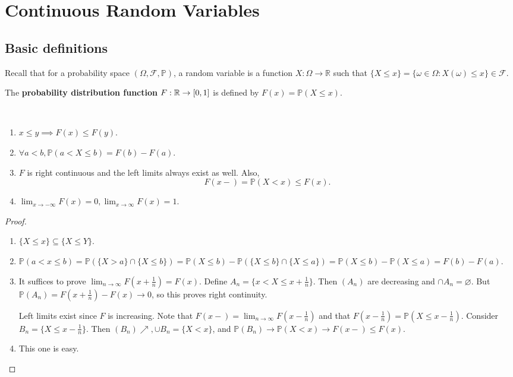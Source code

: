 \section{Continuous Random Variables}
\subsection{Basic definitions}
Recall that for a probability space $(\Omega,\mathscr F,\mathbb P)$, a random variable is a function $X:\Omega\to\mathbb R$ such that $\{X\le x\}=\{\omega\in\Omega:X(\omega)\le x\}\in\mathscr F$. 

\begin{definition}
    The \textbf{probability distribution function} $ F:{\mathbb{R}}\to [0,1] $ is defined by $F(x)=\mathbb P(X\le x)$.
\end{definition}

\begin{proposition}\
    \begin{enumerate}
        \item $x\le y\implies F(x)\le F(y)$.
        \item $\forall a<b,\mathbb P(a<X\le b)=F(b)-F(a)$.
        \item $F$ is right continuous and the left limits always exist as well. Also,
        $$F(x-)=\mathbb{P}(X<x)\le F(x).$$
        \item $\displaystyle \lim_{x\to-\infty}F(x)=0,\lim_{x\to\infty}F(x)=1.$
    \end{enumerate}
\end{proposition}
\begin{proof}\
    \begin{enumerate}
        \item $ \{X\le x\} \subseteq \{X\le Y\} $.
        \item $ \mathbb{P}(a<x\le b)=\mathbb{P}(\{X>a\}\cap \{X\le b\})=\mathbb{P}(X\le b)-\mathbb{P}(\{X\le b\}\cap \{X\le a\})=\mathbb{P}(X\le b)-\mathbb{P}(X\le a)=F(b)-F(a) $.
        \item It suffices to prove $ \lim_{n \to \infty} F(x+\frac{1}{n})=F(x) $. Define $ A_n=\{x<X\le x+\frac{1}{n}\} $. Then $(A_n)$ are decreasing and $ \cap A_n = \varnothing $. But $ \mathbb{P}(A_n)=F(x+\frac{1}{n})-F(x)\to 0 $, so this proves right continuity. 

        Left limits exist since $F$ is increasing. Note that $ F(x-)=\lim_{n \to \infty} F(x-\frac{1}{n}) $ and that $ F(x-\frac{1}{n})=\mathbb{P}(X\le x-\frac{1}{n}) $. Consider $ B_n=\{X\le x-\frac{1}{n}\} $. Then $ (B_n) \nearrow, \cup B_n=\{X<x\} $, and $ \mathbb{P}(B_n)\to\mathbb{P}(X<x)\to F(x-)\le F(x) $.
        \item This one is easy.
    \end{enumerate}
\end{proof}


